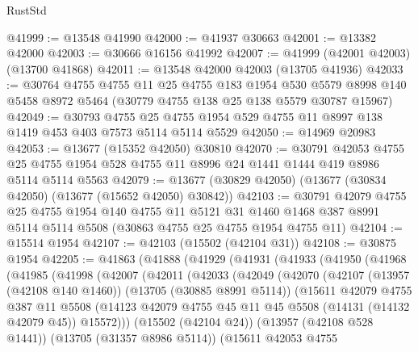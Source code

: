 \begin{lexlean}{RustStd}
\begin{coremodule}
@41999 := @13548 @41990
@42000 := @41937 @30663
@42001 := @13382 @42000
@42003 := @30666 @16156 @41992
@42007 := @41999 (@42001 @42003) (@13700 @41868)
@42011 := @13548 @42000 @42003 (@13705 @41936)
@42033 := @30764
    @4755
    @4755
    @11
    @25
    @4755
    @183
    @1954
    @530
    @5579
    @8998
    @140
    @5458
    @8972
    @5464
    (@30779 @4755 @138 @25 @138 @5579 @30787 @15967)
@42049 := @30793
    @4755
    @25
    @4755
    @1954
    @529
    @4755
    @11
    @8997
    @138
    @1419
    @453
    @403
    @7573
    @5114
    @5114
    @5529
@42050 := @14969 @20983
@42053 := @13677 (@15352 @42050) @30810
@42070 := @30791
    @42053
    @4755
    @25
    @4755
    @1954
    @528
    @4755
    @11
    @8996
    @24
    @1441
    @1444
    @419
    @8986
    @5114
    @5114
    @5563
@42079 := @13677 (@30829 @42050) (@13677 (@30834 @42050) (@13677 (@15652 @42050) @30842))
@42103 := @30791
    @42079
    @4755
    @25
    @4755
    @1954
    @140
    @4755
    @11
    @5121
    @31
    @1460
    @1468
    @387
    @8991
    @5114
    @5114
    @5508
    (@30863 @4755 @25 @4755 @1954 @4755 @11)
@42104 := @15514 @1954
@42107 := @42103 (@15502 (@42104 @31))
@42108 := @30875 @1954
@42205 := @41863
    (@41888
      (@41929
        (@41931
          (@41933
            (@41950
              (@41968
                (@41985
                  (@41998
                    (@42007
                      (@42011
                        (@42033
                          (@42049
                            (@42070
                              (@42107
                                (@13957 (@42108 @140 @1460))
                                (@13705 (@30885 @8991 @5114))
                                (@15611
                                  @42079
                                  @4755
                                  @387
                                  @11
                                  @5508
                                  (@14123
                                    @42079
                                    @4755
                                    @45
                                    @11
                                    @45
                                    @5508
                                    (@14131 (@14132 @42079 @45))
                                    @15572)))
                              (@15502 (@42104 @24))
                              (@13957 (@42108 @528 @1441))
                              (@13705 (@31357 @8986 @5114))
                              (@15611
                                @42053
                                @4755

\end{coremodule}
\end{lexlean}
